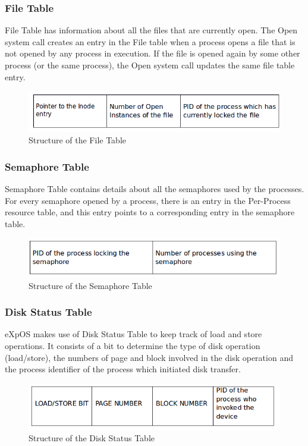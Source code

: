 \documentclass[10pt]{article}
\begin{document}
\subsubsection{File Table}

File Table has information about all the files that are currently open.  The Open system call creates an entry in the File table when a process opens a file that is not opened by any process in execution. If the file is opened again by some other process (or the same process), the Open system call updates the same file table entry.
\begin{figure}[ht]
\centering
\includegraphics[scale=0.50]{File_table.png}
\caption{\footnotesize Structure of the File Table}
\label{fig_5}
\end{figure}
\subsubsection{Semaphore Table}

Semaphore Table contains details about all the semaphores used by the processes. For every semaphore opened by a process, there is an entry in the Per-Process resource table,  and this entry points to a corresponding entry in the semaphore table.
\begin{figure}[ht]
\centering
\includegraphics[scale=0.50]{Semaphore_Table.png}
\caption{\footnotesize Structure of the Semaphore Table}
\label{fig_6}
\end{figure}
\subsubsection{Disk Status Table}

eXpOS makes use of Disk Status Table to keep track of load and store operations. It consists of a bit to determine the type of disk operation (load/store), the numbers of page and block involved in the disk operation and the process identifier of the process which initiated disk transfer.
\begin{figure}[ht]
\centering
\includegraphics[scale=0.50]{Disk_Status.png}
\caption{\footnotesize Structure of the Disk Status Table}
\label{fig_7}
\end{figure}
\\ \\
\end{document}
